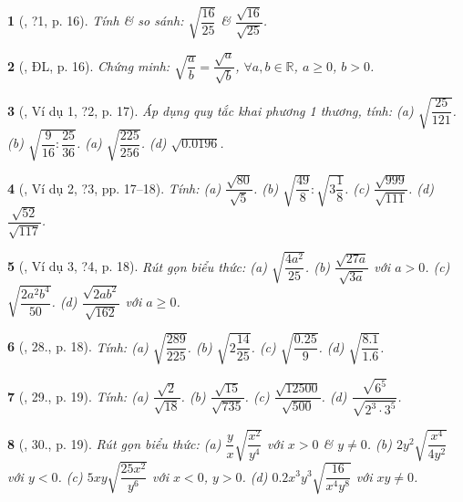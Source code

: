 \documentclass{article}
\newtheorem{baitoan}{}
\begin{document}
\begin{baitoan}[\cite{SGK_Toan_9_tap_1}, ?1, p. 16]
	Tính \& so sánh: $\sqrt{\dfrac{16}{25}}$ \& $\dfrac{\sqrt{16}}{\sqrt{25}}$.
\end{baitoan}

\begin{baitoan}[\cite{SGK_Toan_9_tap_1}, ĐL, p. 16]
	Chứng minh: $\sqrt{\dfrac{a}{b}} = \dfrac{\sqrt{a}}{\sqrt{b}}$, $\forall a,b\in\mathbb{R}$, $a\ge0$, $b > 0$.
\end{baitoan}

\begin{baitoan}[\cite{SGK_Toan_9_tap_1}, Ví dụ 1, ?2, p. 17]
	Áp dụng quy tắc khai phương 1 thương, tính: (a) $\sqrt{\dfrac{25}{121}}$. (b) $\sqrt{\dfrac{9}{16}:\dfrac{25}{36}}$. (a) $\sqrt{\dfrac{225}{256}}$. (d) $\sqrt{0.0196}$.
\end{baitoan}

\begin{baitoan}[\cite{SGK_Toan_9_tap_1}, Ví dụ 2, ?3, pp. 17--18]
	Tính: (a) $\dfrac{\sqrt{80}}{\sqrt{5}}$. (b) $\sqrt{\dfrac{49}{8}}:\sqrt{3\dfrac{1}{8}}$. (c) $\dfrac{\sqrt{999}}{\sqrt{111}}$. (d) $\dfrac{\sqrt{52}}{\sqrt{117}}$.
\end{baitoan}

\begin{baitoan}[\cite{SGK_Toan_9_tap_1}, Ví dụ 3, ?4, p. 18]
	Rút gọn biểu thức: (a) $\sqrt{\dfrac{4a^2}{25}}$. (b) $\dfrac{\sqrt{27a}}{\sqrt{3a}}$ với $a > 0$. (c) $\sqrt{\dfrac{2a^2b^4}{50}}$. (d) $\dfrac{\sqrt{2ab^2}}{\sqrt{162}}$ với $a\ge0$.
\end{baitoan}

\begin{baitoan}[\cite{SGK_Toan_9_tap_1}, 28., p. 18]
	Tính: (a) $\sqrt{\dfrac{289}{225}}$. (b) $\sqrt{2\dfrac{14}{25}}$. (c) $\sqrt{\dfrac{0.25}{9}}$. (d) $\sqrt{\dfrac{8.1}{1.6}}$.
\end{baitoan}

\begin{baitoan}[\cite{SGK_Toan_9_tap_1}, 29., p. 19]
	Tính: (a) $\dfrac{\sqrt{2}}{\sqrt{18}}$. (b) $\dfrac{\sqrt{15}}{\sqrt{735}}$. (c) $\dfrac{\sqrt{12500}}{\sqrt{500}}$. (d) $\dfrac{\sqrt{6^5}}{\sqrt{2^3\cdot3^5}}$.
\end{baitoan}

\begin{baitoan}[\cite{SGK_Toan_9_tap_1}, 30., p. 19]
	Rút gọn biểu thức: (a) $\dfrac{y}{x}\sqrt{\dfrac{x^2}{y^4}}$ với $x > 0$ \& $y\ne0$. (b) $2y^2\sqrt{\dfrac{x^4}{4y^2}}$ với $y < 0$. (c) $5xy\sqrt{\dfrac{25x^2}{y^6}}$ với $x < 0$, $y > 0$. (d) $0.2x^3y^3\sqrt{\dfrac{16}{x^4y^8}}$ với $xy\ne0$.
\end{baitoan}
\end{document}
